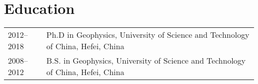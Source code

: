 \section*{Education}

\begin{tabular}{p{} p{}}
2012--2018 & Ph.D in Geophysics, University of Science and Technology of China, Hefei, China \\
2008--2012 & B.S. in Geophysics, University of Science and Technology of China, Hefei, China
\end{tabular}
